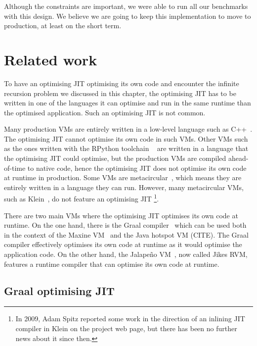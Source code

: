 \documentclass[a4paper,12pt,twoside]{../includes/ThesisStyle}
\begin{document}
Although the constraints are important, we were able to run all our benchmarks with this design. We believe we are going to keep this implementation to move to production, at least on the short term.


\section{Related work}

To have an optimising JIT optimising its own code and encounter the infinite recursion problem we discussed in this chapter, the optimising JIT has to be written in one of the languages it can optimise and run in the same runtime than the optimised application. Such an optimising JIT is not common.

Many production VMs are entirely written in a low-level language such as C++~\cite{V8,Webkit15}. The optimising JIT cannot optimise its own code in such VMs. Other VMs such as the ones written with the RPython toolchain ~\cite{Rigo06a} are written in a language that the optimising JIT could optimise, but the production VMs are compiled ahead-of-time to native code, hence the optimising JIT does not optimise its own code at runtime in production. Some VMs are metacircular~\cite{Unga05b,Alp99a}, which means they are entirely written in a language they can run. However, many metacircular VMs, such as Klein~\cite{Unga05b}, do not feature an optimising JIT \footnote{In 2009, Adam Spitz reported some work in the direction of an inlining JIT compiler in Klein on the project web page, but there has been no further news about it since then.}. 

There are two main VMs where the optimising JIT optimises its own code at runtime. On the one hand, there is the Graal compiler~\cite{Oracle13,Dubo13c} which can be used both in the context of the Maxine VM~\cite{Wimm13a} and the Java hotspot VM (CITE). The Graal compiler effectively optimises its own code at runtime as it would optimise the application code. On the other hand, the Jalape\~no VM~\cite{Alp99a}, now called Jikes RVM, features a runtime compiler that can optimise its own code at runtime. 

\subsection{Graal optimising JIT}
\end{document}
